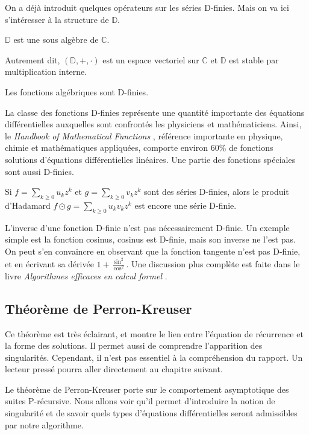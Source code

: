 \documentclass[a4paper,10pt]{article}
\begin{document}
	On a déjà introduit quelques opérateurs sur les séries D-finies. Mais on va ici s'intéresser à la structure de $\mathbb{D}$.
	\begin{proposition}
		$\mathbb{D}$ est une sous algèbre de $\mathbb{C}$.
	\end{proposition}
	Autrement dit, $(\mathbb{D},+,\cdot)$ est un espace vectoriel sur $\mathbb{C}$ et $\mathbb{D}$ est stable par multiplication interne.
	\begin{proposition}
		Les fonctions algébriques sont D-finies. 
	\end{proposition}
	La classe des fonctions D-finies représente une quantité importante des équations différentielles auxquelles sont confrontés les physiciens et mathématiciens. Ainsi, le \textit{Handbook of Mathematical Functions} \cite{abramowitz1948handbook}, référence importante en physique, chimie et
	mathématiques appliquées, comporte environ 60\% de fonctions solutions d’équations différentielles linéaires. Une partie des fonctions spéciales sont aussi D-finies.
	\begin{proposition}
		Si $f=\sum_{k \geq 0}u_kz^k$ et $g=\sum_{k \geq 0}v_kz^k$ sont des séries D-finies, alors le produit d'Hadamard $f \odot g=\sum_{k \geq 0}u_kv_kz^k$ est encore une série D-finie.
	\end{proposition}
	L'inverse d'une fonction D-finie n'est pas nécessairement D-finie. Un exemple simple est la fonction cosinus, cosinus est D-finie, mais son inverse ne l'est pas.
	On peut s'en convaincre en observant que la fonction tangente n'est pas D-finie, et en écrivant sa dérivée $1+ \frac{\sin^2}{\cos^2}$.
	Une discussion plus complète est faite dans le livre \textit{Algorithmes efficaces en calcul formel} \cite{aecf-2017-livre}.
	
	\noindent\textbf{}
	\subsection{Théorème de Perron-Kreuser}
	Ce théorème est très éclairant, et montre le lien entre l'équation de récurrence et la forme des solutions. Il permet aussi de comprendre l'apparition des singularités. Cependant, il n'est pas essentiel à la compréhension du rapport. Un lecteur pressé pourra aller directement au chapitre suivant.
	
	Le théorème de Perron-Kreuser  porte sur le comportement asymptotique des suites P-récursive. Nous allons voir qu'il permet d'introduire la notion de  singularité et de savoir quels types d'équations différentielles seront admissibles par notre algorithme. 
	
\end{document}
